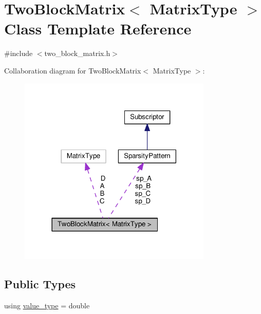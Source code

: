 \hypertarget{class_two_block_matrix}{}\section{Two\+Block\+Matrix$<$ Matrix\+Type $>$ Class Template Reference}
\label{class_two_block_matrix}


{\ttfamily \#include $<$two\+\_\+block\+\_\+matrix.\+h$>$}



Collaboration diagram for Two\+Block\+Matrix$<$ Matrix\+Type $>$\+:\nopagebreak
\begin{figure}[H]
\begin{center}
\leavevmode
\includegraphics[width=261pt]{class_two_block_matrix__coll__graph}
\end{center}
\end{figure}
\subsection*{Public Types}
\begin{DoxyCompactItemize}
\item 
using \hyperlink{class_two_block_matrix_a9f50fb1f98df3ae0048c3c5220aa265f}{value\+\_\+type} = double
\end{DoxyCompactItemize}
